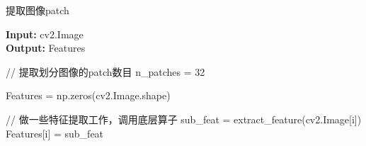 \documentclass[a4paper,12pt]{article}
\begin{document}
\begin{CJK}{UTF8}{gbsn}
    \begin{algorithm}
        \setcounter{algorithm}{1}
        \caption{提取图像patch}
        \hspace*{0.02in} {\bf Input:} cv2.Image\\
        \hspace*{0.02in} {\bf Output:} Features
        \begin{algorithmic}[1]
            \State // 提取划分图像的patch数目
            \State n\_patches = 32

            \State Features = np.zeros(cv2.Image.shape)

            \State // 做一些特征提取工作，调用底层算子
            \State sub\_feat = extract\_feature(cv2.Image[i])
            \State Features[i] = sub\_feat
            \EndFor
        \end{algorithmic}
    \end{algorithm}
\end{CJK}
\end{document}
